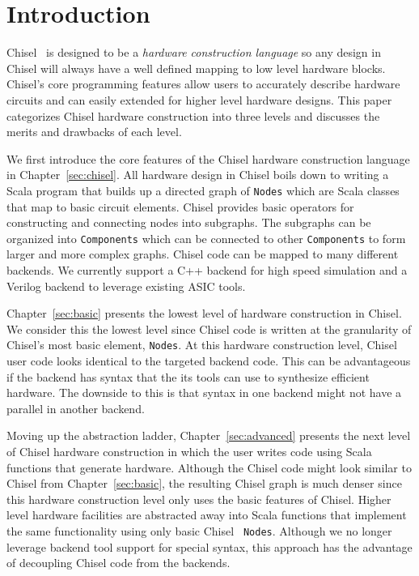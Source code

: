 \section{Introduction}
\label{sec:intro}
Chisel~\cite{Bachrach:2012} is designed to be a {\it hardware construction language} so any
design in Chisel will always have a well defined mapping to low level
hardware blocks. Chisel's core programming features allow users to
accurately describe hardware circuits and can easily extended for
higher level hardware designs. This paper categorizes Chisel hardware
construction into three levels and discusses the merits and drawbacks
of each level.

We first introduce the core features of the Chisel hardware
construction language in Chapter~\ref{sec:chisel}. All hardware design
in Chisel boils down to writing a Scala program that builds up a directed
graph of {\tt Nodes} which are Scala classes that map to basic circuit
elements. Chisel provides basic operators for constructing and
connecting nodes into subgraphs. The subgraphs can be organized into
{\tt Components} which can be connected to other {\tt Components} to
form larger and more complex graphs. Chisel code can be mapped to many
different backends. We currently support a C++ backend for high speed
simulation and a Verilog backend to leverage existing ASIC tools.

Chapter~\ref{sec:basic} presents the lowest level of hardware
construction in Chisel. We consider this the lowest level since
Chisel code is written at the granularity of Chisel's most basic
element, {\tt Nodes}. At this hardware construction level, Chisel user
code looks identical to the targeted backend code. This can be
advantageous if the backend has syntax that the its tools can use to
synthesize efficient hardware. The downside to this is that syntax in
one backend might not have a parallel in another backend.

Moving up the abstraction ladder, Chapter~\ref{sec:advanced} presents
the next level of Chisel hardware construction in which the user
writes code using Scala functions that generate hardware. Although the
Chisel code might look similar to Chisel from Chapter~\ref{sec:basic},
the resulting Chisel graph is much denser since this hardware
construction level only uses the basic features of Chisel. Higher
level hardware facilities are abstracted away into Scala functions that
implement the same functionality using only basic Chisel {\tt
  Nodes}. Although we no longer leverage backend tool support for
special syntax, this approach has the advantage of decoupling Chisel
code from the backends.

